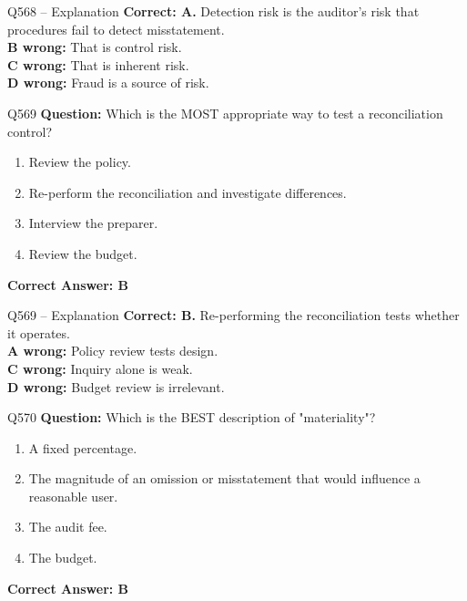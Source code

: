 \documentclass[aspectratio=169,10pt]{beamer}
\begin{document}
	\begin{frame}[t]{Q568 -- Explanation}
		\small
		\textbf{Correct: A.} Detection risk is the auditor's risk that procedures fail to detect misstatement. \\[4pt]
		\textbf{B wrong:} That is control risk. \\[2pt]
		\textbf{C wrong:} That is inherent risk. \\[2pt]
		\textbf{D wrong:} Fraud is a source of risk.
	\end{frame}
	
	\begin{frame}[t]{Q569}
		\small
		\textbf{Question:} Which is the MOST appropriate way to test a reconciliation control?
		\begin{enumerate}[label=\Alph*.,itemsep=1pt,topsep=2pt]
			\item Review the policy.
			\item Re-perform the reconciliation and investigate differences.
			\item Interview the preparer.
			\item Review the budget.
		\end{enumerate}
		\vspace{4pt}
		\textbf{Correct Answer: B}
	\end{frame}
	
	\begin{frame}[t]{Q569 -- Explanation}
		\small
		\textbf{Correct: B.} Re-performing the reconciliation tests whether it operates. \\[4pt]
		\textbf{A wrong:} Policy review tests design. \\[2pt]
		\textbf{C wrong:} Inquiry alone is weak. \\[2pt]
		\textbf{D wrong:} Budget review is irrelevant.
	\end{frame}
	
	\begin{frame}[t]{Q570}
		\small
		\textbf{Question:} Which is the BEST description of "materiality"?
		\begin{enumerate}[label=\Alph*.,itemsep=1pt,topsep=2pt]
			\item A fixed percentage.
			\item The magnitude of an omission or misstatement that would influence a reasonable user.
			\item The audit fee.
			\item The budget.
		\end{enumerate}
		\vspace{4pt}
		\textbf{Correct Answer: B}
	\end{frame}
	
\end{document}
